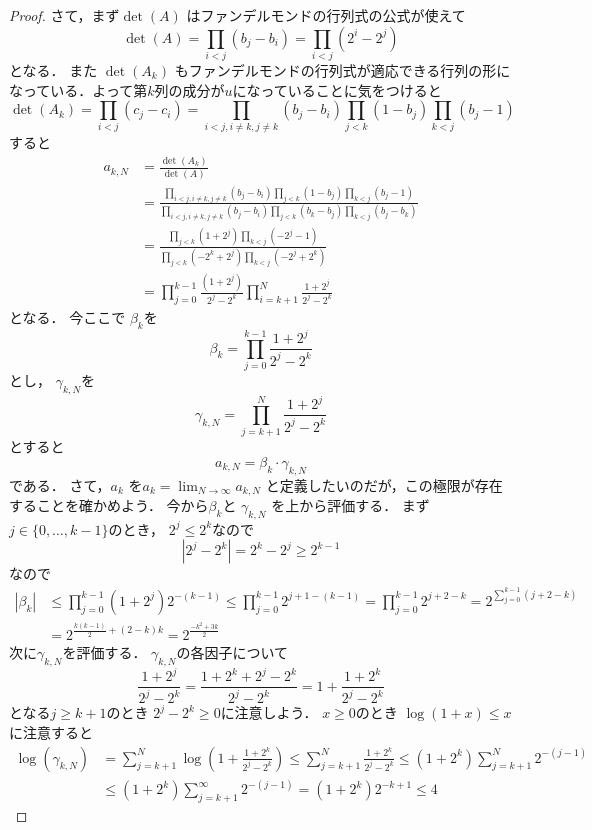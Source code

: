 \documentclass[leqno, a4paper, 12pt]{jsarticle}
\begin{document}
\begin{proof}
さて，まず$\det(A)$
はファンデルモンドの行列式の公式が使えて
\[
\det(A)=\prod_{i<j}(b_{j}-b_{i})=
\prod_{i<j}(2^{i}-2^{j})
\]
となる．
また
$\det(A_{k})$
もファンデルモンドの行列式が適応できる行列の形になっている．よって第$k$列の成分が$u$になっていることに気をつけると
\[
\det(A_{k})=\prod_{i<j}(c_{j}-c_{i})
=\prod_{i<j, i\neq k, j\neq k}(b_{j}-b_{i})
\prod_{j<k}(1-b_{j})\prod_{k<j}(b_{j}-1)
\]
すると
\begin{align*}
a_{k, N}
&=
\frac{\det(A_{k})}{\det(A)}\\
&=
\frac{\prod_{i<j, i\neq k, j\neq k}(b_{j}-b_{i})
\prod_{j<k}(1-b_{j})\prod_{k<j}(b_{j}-1)
}{\prod_{i<j, i\neq k, j\neq k}(b_{j}-b_{i})
\prod_{j<k}(b_{k}-b_{j})\prod_{k<j}(b_{j}-b_{k})
}\\
&=
\frac{
\prod_{j<k}(1+2^{j})\prod_{k<j}(-2^{j}-1)
}{
\prod_{j<k}(-2^{k}+2^{j})\prod_{k<j}(-2^{j}+2^{k})
}\\
&=
\prod_{j=0}^{k-1}\frac{(1+2^{j})}{2^{j}-2^{k}}
\prod_{i=k+1}^{N}
\frac{1+2^{j}}{2^{j}-2^{k}}
\end{align*}
となる．
今ここで
$\beta_{k}$を
\[
\beta_{k}=\prod_{j=0}^{k-1}\frac{1+2^{j}}{2^{j}-2^{k}}
\]
とし，
$\gamma_{k, N}$を
\[
\gamma_{k, N}=
\prod_{j=k+1}^{N}\frac{1+2^{j}}{2^{j}-2^{k}}
\]
とすると
\[
a_{k, N}=\beta_{k}\cdot \gamma_{k, N}
\]
である．
さて，$a_{k}$
を$a_{k}=\lim_{N\to \infty}a_{k, N}$
と定義したいのだが，この極限が存在することを確かめよう．
今から$\beta_{k}$と
$\gamma_{k, N}$
を上から評価する．
まず$j\in \{0, \dots, k-1\}$のとき，
$2^{j}\le 2^{k}$なので
\[
|2^{j}-2^{k}|=2^{k}-2^{j}\ge 2^{k-1}
\]
なので
\begin{align*}
|\beta_{k}|&\le \prod_{j=0}^{k-1}(1+2^{j})2^{-(k-1)}
\le \prod_{j=0}^{k-1}2^{j+1-(k-1)}
=\prod_{j=0}^{k-1}2^{j+2-k}
=2^{\sum_{j=0}^{k-1}(j+2-k)}\\
&=
2^{\frac{k(k-1)}{2}+(2-k)k}
=2^{\frac{-k^{2}+3k}{2}}
\end{align*}
次に$\gamma_{k, N}$を評価する．
$\gamma_{k, N}$の各因子について
\[
\frac{1+2^{j}}{2^{j}-2^{k}}=\frac{1+2^{k}+2^{j}-2^{k}}{2^{j}-2^{k}}=
1+\frac{1+2^{k}}{2^{j}-2^{k}}
\]
となる$j\ge k+1$のとき
$2^{j}-2^{k}\ge 0$に注意しよう．
$x\ge 0$のとき
$\log(1+x)\le x$に注意すると
\begin{align*}
\log(\gamma_{k, N})
&=
\sum_{j=k+1}^{N}\log\left(1+\frac{1+2^{k}}{2^{j}-2^{k}}\right)\le 
\sum_{j=k+1}^{N}\frac{1+2^{k}}{2^{j}-2^{k}}
\le 
(1+2^{k})\sum_{j=k+1}^{N}2^{-(j-1)}\\
&\le 
(1+2^{k})\sum_{j=k+1}^{\infty}2^{-(j-1)}
=(1+2^{k})2^{-k+1}\le 4
\end{align*}

\end{proof}
\end{document}

